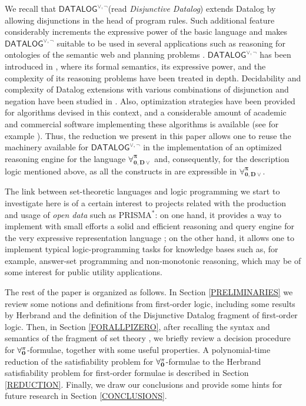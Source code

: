 \documentclass[a4paper]{llncs}
\newcommand{\DisjDatalog}{\ensuremath{\mathsf{DATALOG}^{\vee,\neg}}\xspace}
\newcommand{\ForallpizeroDisjDatalog}{\ensuremath{\mathbf{\forall_{0,D\vee}^{\pi}}}\xspace}
\begin{document}
We recall that \DisjDatalog (read \emph{Disjunctive Datalog})
extends Datalog by allowing disjunctions in the
head of program rules. Such additional feature considerably increments the expressive power of the basic language and makes \DisjDatalog suitable to be used in several applications such as reasoning for ontologies of the semantic web \cite{hustadt2007reasoning} and planning problems \cite{Eiter:2004}. 
\DisjDatalog has been introduced in \cite{EitGotMan1997}, where its formal semantics, its expressive power, and the complexity of its reasoning problems have been treated in depth. Decidability and complexity of Datalog
extensions with various combinations of disjunction and negation have
been studied in \cite{AlvianoFLM12,GottlobMMP12}.
Also, optimization strategies have been provided for
algorithms devised in this context, and a considerable amount of
academic and commercial software implementing these algorithms is
available (see for example \cite{AlvFabLeoPerPfeTer2011}).  Thus, the
reduction we present in this paper allows one to reuse the machinery
available for \DisjDatalog in the implementation of an optimized
reasoning engine for the language \ForallpizeroDisjDatalog and,
consequently, for the description logic \dlForallpizero mentioned
above, as all the constructs in \dlForallpizero are expressible in
\ForallpizeroDisjDatalog.

The link between set-theoretic languages and logic programming
we start to investigate here is of a certain interest to projects related
with the production and usage of \emph{open data} such as PRISMA$^{*}$:
on one hand, it provides a way to implement with small efforts a solid
and efficient reasoning and query engine for
the very expressive representation language \dlForallpizero; on the
other hand, it allows one to implement typical logic-programming tasks
for \dlForallpizero knowledge bases such as, for example,
answer-set programming and non-monotonic reasoning,
which may be of some interest for public utility applications.

The rest of the paper is organized as follows.  In Section
\ref{PRELIMINARIES} we review some notions and definitions from
first-order logic, including some results by
Herbrand and the definition of the Disjunctive Datalog
fragment of first-order logic.  Then, in Section \ref{FORALLPIZERO},
after recalling the syntax and semantics of the fragment of set theory
\Forallpizero, we briefly review a decision procedure for
$\mathbf{\forall_{0}^{\pi}}$-formulae, together with some useful properties.  A 
polynomial-time reduction of the satisfiability problem for
$\mathbf{\forall_{0}^{\pi}}$-formulae to the Herbrand satisfiability problem for
first-order formulae is described in Section \ref{REDUCTION}.
Finally, we draw our conclusions and provide some hints for future
research in Section \ref{CONCLUSIONS}.
\end{document}
